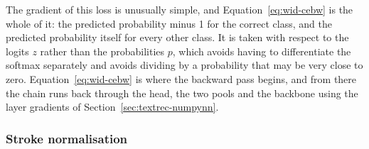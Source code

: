 The gradient of this loss is unusually simple, and Equation~\ref{eq:wid-cebw} is the whole of it: the predicted probability minus 1 for the correct class, and the predicted probability itself for every other class. It is taken with respect to the logits $z$ rather than the probabilities $p$, which avoids having to differentiate the softmax separately and avoids dividing by a probability that may be very close to zero. Equation~\ref{eq:wid-cebw} is where the backward pass begins, and from there the chain runs back through the head, the two pools and the backbone using the layer gradients of Section~\ref{sec:textrec-numpynn}.



\subsubsection{Stroke normalisation}
\label{sec:wid-strokenorm}

